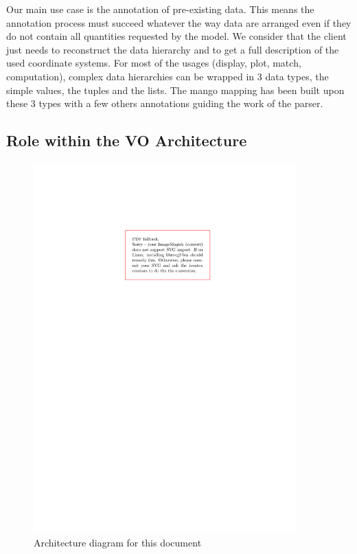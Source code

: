 \documentclass[11pt,a4paper]{ivoa}
\begin{document}
Our main use case is the annotation  of pre-existing data. This  means the annotation process must succeed whatever the way data are arranged even if they do not contain all quantities requested by the model.  We consider that the client just needs to reconstruct the data hierarchy and to get a full description of the used coordinate systems. For most of the usages (display, plot, match, computation),  complex data hierarchies can be wrapped in 3 data types, the simple values, the tuples and the lists. The mango mapping has been built upon these 3 types with a few others annotations guiding the work of the parser.

\lstset{language=XML}

\subsection{Role within the VO Architecture}

\begin{figure}
\centering


\includegraphics[width=0.9\textwidth]{role_diagram.pdf}
\caption{Architecture diagram for this document}
\label{fig:archdiag}
\end{figure}
\end{document}
